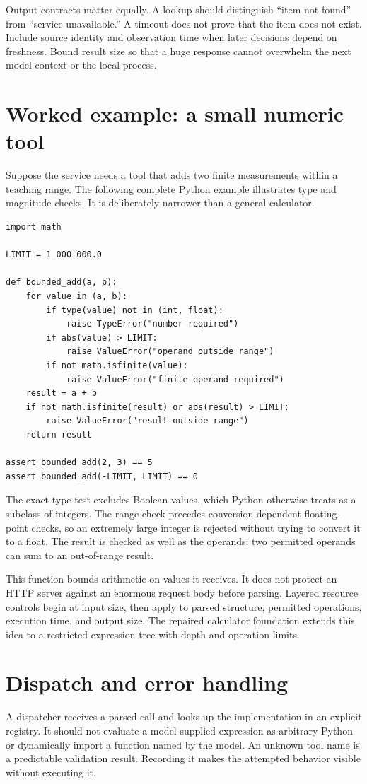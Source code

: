 Output contracts matter equally. A lookup should distinguish “item not found” from “service unavailable.” A timeout does not prove that the item does not exist. Include source identity and observation time when later decisions depend on freshness. Bound result size so that a huge response cannot overwhelm the next model context or the local process.

\section{Worked example: a small numeric tool}
Suppose the service needs a tool that adds two finite measurements within a teaching range. The following complete Python example illustrates type and magnitude checks. It is deliberately narrower than a general calculator.

\begin{Verbatim}[breaklines=true,breakanywhere=true,fontsize=\small,frame=single]
import math

LIMIT = 1_000_000.0

def bounded_add(a, b):
    for value in (a, b):
        if type(value) not in (int, float):
            raise TypeError("number required")
        if abs(value) > LIMIT:
            raise ValueError("operand outside range")
        if not math.isfinite(value):
            raise ValueError("finite operand required")
    result = a + b
    if not math.isfinite(result) or abs(result) > LIMIT:
        raise ValueError("result outside range")
    return result

assert bounded_add(2, 3) == 5
assert bounded_add(-LIMIT, LIMIT) == 0
\end{Verbatim}

The exact-type test excludes Boolean values, which Python otherwise treats as a subclass of integers. The range check precedes conversion-dependent floating-point checks, so an extremely large integer is rejected without trying to convert it to a float. The result is checked as well as the operands: two permitted operands can sum to an out-of-range result.

This function bounds arithmetic on values it receives. It does not protect an HTTP server against an enormous request body before parsing. Layered resource controls begin at input size, then apply to parsed structure, permitted operations, execution time, and output size. The repaired calculator foundation extends this idea to a restricted expression tree with depth and operation limits.

\section{Dispatch and error handling}
A dispatcher receives a parsed call and looks up the implementation in an explicit registry. It should not evaluate a model-supplied expression as arbitrary Python or dynamically import a function named by the model. An unknown tool name is a predictable validation result. Recording it makes the attempted behavior visible without executing it.

